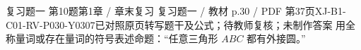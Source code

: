 \par\noindent\begin{minipage}{\linewidth}
\begin{bankitem}{复习题一 第10题}{第1章 / 章末复习 复习题一 / 教材 p.30 / PDF 第37页}{XJ-B1-C01-RV-P030-Y0307}{已对照原页转写题干及公式；待教师复核；未制作答案}
用全称量词或存在量词的符号表述命题：“任意三角形 $ABC$ 都有外接圆。”
\end{bankitem}
\end{minipage}\par\medskip
